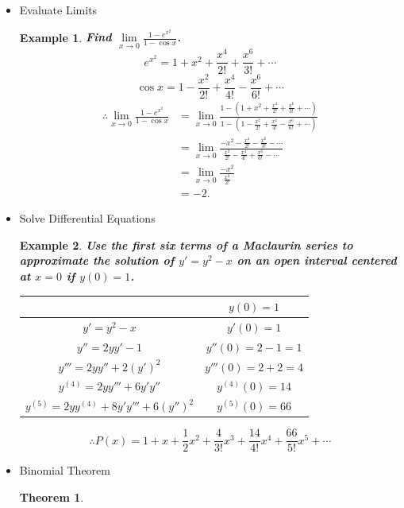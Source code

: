 \documentclass[12pt, a4paper]{article}
\newtheorem{theorem}{Theorem}[subsection]
\newtheorem{example}{Example}[subsection]
\begin{document}
\begin{enumerate}
\begin{itemize}
        \item Evaluate Limits
        \begin{example}
            \textbf{Find $\lim\limits_{x\to 0}\frac{1-e^{x^2}}{1-\cos x}$.}
            $$e^{x^2}=1+x^2+\frac{x^4}{2!}+\frac{x^6}{3!}+\cdots$$
            $$\cos x=1-\frac{x^2}{2!}+\frac{x^4}{4!}-\frac{x^6}{6!}+\cdots$$
            $$\begin{aligned}
                \therefore \lim_{x\to 0}\frac{1-e^{x^2}}{1-\cos x}&=\lim_{x\to 0}\frac{1-\left(1+x^2+\frac{x^4}{2!}+\frac{x^6}{3!}+\cdots\right)}{1-\left(1-\frac{x^2}{2!}+\frac{x^4}{4!}-\frac{x^6}{6!}+\cdots\right)}\\
                &=\lim_{x\to 0}\frac{-x^2-\frac{x^4}{2!}-\frac{x^6}{3!}-\cdots}{\frac{x^2}{2!}-\frac{x^4}{4!}+\frac{x^6}{6!}-\cdots}\\
                &=\lim_{x\to 0}\frac{-x^2}{\frac{x^2}{2!}}\\
                &=-2.
            \end{aligned}$$
            {\color{green}{[Consider only the smallest power of $x$, as higher powers will go to zero much quicker.]}}
        \end{example}
        \item Solve Differential Equations
        \begin{example}
            \textbf{Use the first six terms of a Maclaurin series to approximate the solution of $y'=y^2-x$ on an open interval centered at $x=0$ if $y(0)=1$.}
            \begin{center}\begin{tabular}{c|c}
                &$y(0)=1$\\
                \hline
                $y'=y^2-x$&$y'(0)=1$\\
                $y''=2yy'-1$&$y''(0)=2-1=1$\\
                $y'''=2yy''+2(y')^2$&$y'''(0)=2+2=4$\\
                $y^{(4)}=2yy'''+6y'y''$&$y^{(4)}(0)=14$\\
                $y^{(5)}=2yy^{(4)}+8y'y'''+6(y'')^2$&$y^{(5)}(0)=66$
            \end{tabular}\end{center}
        $$\therefore P(x)=1+x+\frac{1}{2}x^2+\frac{4}{3!}x^3+\frac{14}{4!}x^4+\frac{66}{5!}x^5+\cdots$$
        \end{example}
        \item Binomial Theorem
        \begin{theorem}

\end{theorem}
\end{itemize}
\end{enumerate}
\end{document}
